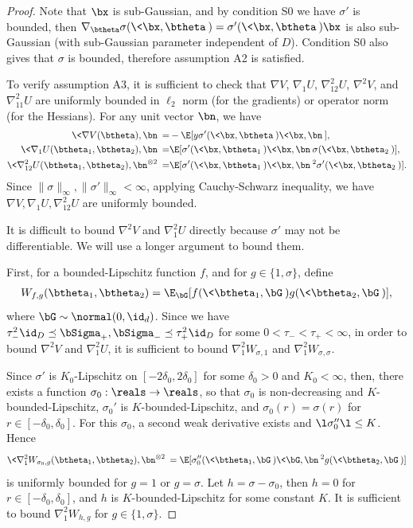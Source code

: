 \documentclass[11pt]{article}
\begin{document}
\begin{proof}
Note that $\bx$ is sub-Gaussian, and by condition {\sf S0} we have $\sigma'$ is bounded, then $\nabla_\btheta \sigma(\< \bx, \btheta \>) = \sigma'(\< \bx, \btheta \>) \bx$ is also sub-Gaussian (with sub-Gaussian parameter independent of $D$). Condition {\sf S0} also gives that $\sigma$ is bounded, therefore assumption {\sf A2} is satisfied. 

To verify assumption {\sf A3}, it is sufficient to check that $\nabla V$, $\nabla_1 U$, $\nabla_{12}^2 U$, $\nabla^2 V$, and $\nabla_{11}^2 U$ are uniformly bounded
in $\ell_2$ norm (for the gradients) or operator norm (for the Hessians). For any unit vector $\bn$, we have 
\begin{align}
\< \nabla V(\btheta), \bn\> =& -\E[y\sigma'(\< \bx, \btheta\>) \< \bx, \bn\>], \\
\< \nabla_1 U(\btheta_1, \btheta_2), \bn \>=& \E[\sigma'(\< \bx, \btheta_1\>) \< \bx, \bn\> \sigma(\< \bx, \btheta_2 \>)], \\
\<\nabla_{12}^2U(\btheta_1, \btheta_2), \bn^{\otimes 2}\> =& \E[\sigma'(\< \bx, \btheta_1\>) \< \bx, \bn\>^2 \sigma'(\< \bx, \btheta_2\>)].
\end{align}
Since $\| \sigma \|_\infty, \| \sigma'\|_\infty < \infty$, applying Cauchy-Schwarz inequality, we have $\nabla V, \nabla_1 U, \nabla_{12}^2U$ are uniformly bounded. 

It is difficult to bound $\nabla^2 V$ and $\nabla_1^2 U$ directly because $\sigma'$ may not be differentiable. We will use a longer argument to bound them. 

First, for a bounded-Lipschitz function $f$, and for $g \in \{ 1, \sigma\}$, define
\begin{align}
W_{f, g}(\btheta_1, \btheta_2) = \E_\bG[f(\< \btheta_1, \bG\>) g(\< \btheta_2, \bG \>)], 
\end{align}
where $\bG \sim \normal(0, \id_d)$. Since we have $\tau_-^2 \id_D \preceq \bSigma_+, \bSigma_- \preceq \tau_+^2 \id_D$ for some $0 < \tau_- < \tau_+ < \infty$, in order to bound $\nabla^2 V$ and $\nabla_1^2 U$, it is sufficient to bound $\nabla_1^2 W_{\sigma, 1}$ and $\nabla_1^2 W_{\sigma, \sigma}$. 

Since $\sigma'$ is $K_0$-Lipschitz on $[- 2\delta_0, 2\delta_0]$ for some $\delta_0 > 0$ and $K_0 < \infty$, then, there exists a function $\sigma_0: \reals \to \reals$, so that $\sigma_0$ is non-decreasing and $K$-bounded-Lipschitz, $\sigma_0'$ is $K$-bounded-Lipschitz, and $\sigma_0(r) = \sigma(r)$ for $r \in [-\delta_0, \delta_0]$. For this $\sigma_0$, a
 second weak derivative exists and $\l \sigma_0''\l \le K$. Hence 
\begin{equation}
\begin{aligned}
\< \nabla_1^2 W_{\sigma_0, g}(\btheta_1, \btheta_2), \bn^{\otimes 2}\> = \E[\sigma_0''(\< \btheta_1, \bG\>) \< \bG, \bn\>^2g(\< \btheta_2, \bG \>)]
\end{aligned}
\end{equation}
is uniformly bounded for $g = 1$ or $g = \sigma$. Let $h = \sigma - \sigma_0$, then $h = 0$ for $r \in [-\delta_0, \delta_0]$, and $h$ is $K$-bounded-Lipschitz for some constant $K$. It is sufficient to bound $\nabla_1^2 W_{h, g}$ for $g \in \{1, \sigma\}$.


\end{proof}
\end{document}
